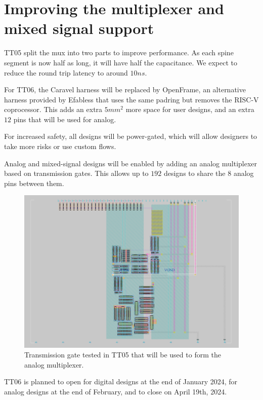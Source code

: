 \section{Improving the multiplexer and mixed signal support}
\label{sec:improving}

TT05 split the mux into two parts to improve performance.
As each spine segment is now half as long, it will have half the capacitance.
We expect to reduce the round trip latency to around \(10 ns\).

For TT06, the Caravel harness will be replaced by OpenFrame\cite{openframe}, an alternative harness provided by Efabless that uses the same padring but removes the RISC-V coprocessor.
This adds an extra \(5 mm^2\) more space for user designs, and an extra \(12\) pins that will be used for analog.

For increased safety, all designs will be power-gated, which will allow designers to take more risks or use custom flows.

Analog and mixed-signal designs will be enabled by adding an analog multiplexer based on transmission gates\cite{transmissiongates}.
This allows up to \(192\) designs to share the \(8\) analog pins between them.

\begin{figure}[htp]
\centering
\includegraphics[width=\columnwidth]{./Figs/tt05_transmission_gate.png}
\caption{Transmission gate tested in TT05 that will be used to form the analog multiplexer.}
\label{fig:transmission_gate_TT05}
\end{figure}

TT06 is planned to open for digital designs at the end of January 2024, for analog designs at the end of February, and to close on April 19th, 2024.

